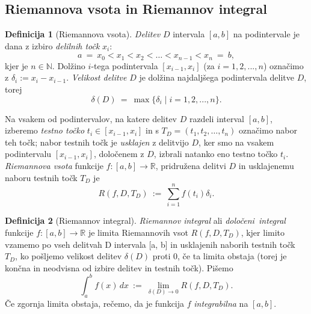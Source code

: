 \documentclass[11pt]{article}
\theoremstyle{definition}
\newtheorem{definicija}{Definicija}[section]
\theoremstyle{definition}
\theoremstyle{definition}
\theoremstyle{theorem}
\begin{document}

\subsection{Riemannova vsota in Riemannov integral}
\vspace{0.5cm}

\begin{definicija}[Riemannova vsota]

\textit{Delitev} $D$ intervala $[a, b]$ na \hbox{podintervale} je dana z izbiro \textit{delilnih točk} $x_i$:
$$a ~=~ x_0 < x_1 < x_2 < \ldots < x_{n-1} < x_n ~=~ b,$$
kjer je $n \in \mathbb{N}$. Dolžino $i$-tega podintervala $[x_{i-1},x_i]$ (za $i=1,2,...,n$) označimo z $\delta_i := x_i - x_{i-1}$. \textit{Velikost delitve} $D$ je dolžina najdaljšega \hbox{podintervala} delitve $D$, torej
$$\delta(D) ~=~ \max{\{\delta_i \mid i = 1, 2, ..., n\}}.$$

\noindent Na vsakem od podintervalov, na katere delitev $D$ razdeli interval $[a, b]$, \hbox{izberemo} \textit{testno točko} $t_i \in [x_{i-1}, x_i]$ in s $T_D = (t_1, t_2, \dots, t_n)$ označimo nabor teh točk; nabor testnih točk je \textit{usklajen} z delitvijo $D$, ker smo na vsakem podintervalu $[x_{i-1},x_i]$, določenem z $D$, izbrali natanko eno testno točko $t_i$. \\

\noindent \textit{Riemannova vsota} funkcije $f:[a, b] \rightarrow \mathbb{R}$, pridružena delitvi $D$ in \hbox{usklajenemu} naboru testnih točk $T_D$ je 
$$R(f, D, T_D) ~:=~ \sum_{i=1}^{n} f(t_i) \delta_i.$$

\end{definicija}
\vspace{0.5cm}

\pagebreak

\begin{definicija}[Riemannov integral]

\textit{Riemannov integral} ali \hbox{\textit{določeni integral}} funkcije $f: [a, b] \rightarrow \mathbb{R}$ je limita Riemannovih vsot $R(f, D, T_D)$, kjer limito vzamemo po vseh delitvah D intervala [a, b] in usklajenih naborih testnih točk $T_D$, ko pošljemo velikost delitev $\delta(D)$ proti $0$, če ta limita obstaja (torej je končna in neodvisna od izbire delitev in testnih točk). Pišemo
$$\int_{a}^{b} f(x)\,dx ~:=~ \lim_{\delta(D) \rightarrow 0} R(f, D, T_D).$$
Če zgornja limita obstaja, rečemo, da je funkcija $f$ \textit{integrabilna} na $[a, b]$.

\end{definicija}
\vspace{0.5cm}
\end{document}
